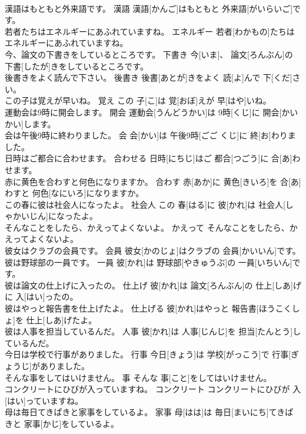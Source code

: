 \documentclass[8pt]{extreport}
\begin{document}
\begin{CJK}{UTF8}{min}
\\	漢語はもともと外来語です。	漢語	漢語[かんご]はもともと 外来語[がいらいご]です。	
\\	若者たちはエネルギーにあふれていますね。	エネルギー	若者[わかもの]たちはエネルギーにあふれていますね。	
\\	今、論文の下書きをしているところです。	下書き	今[いま]、 論文[ろんぶん]の 下書[したが]きをしているところです。	
\\	後書きをよく読んで下さい。	後書き	後書[あとが]きをよく 読[よ]んで 下[くだ]さい。	
\\	この子は覚えが早いね。	覚え	この 子[こ]は 覚[おぼ]えが 早[はや]いね。	
\\	運動会は9時に開会します。	開会	運動会[うんどうかい]は 9時[くじ]に 開会[かいかい]します。	
\\	会は午後9時に終わりました。	会	会[かい]は 午後9時[ごご くじ]に 終[お]わりました。	
\\	日時はご都合に合わせます。	合わせる	日時[にちじ]はご 都合[つごう]に 合[あ]わせます。	
\\	赤に黄色を合わすと何色になりますか。	合わす	赤[あか]に 黄色[きいろ]を 合[あ]わすと 何色[なにいろ]になりますか。	
\\	この春に彼は社会人になったよ。	社会人	この 春[はる]に 彼[かれ]は 社会人[しゃかいじん]になったよ。	
\\	そんなことをしたら、かえってよくないよ。	かえって	そんなことをしたら、かえってよくないよ。	
\\	彼女はクラブの会員です。	会員	彼女[かのじょ]はクラブの 会員[かいいん]です。	
\\	彼は野球部の一員です。	一員	彼[かれ]は 野球部[やきゅうぶ]の 一員[いちいん]です。	
\\	彼は論文の仕上げに入ったの。	仕上げ	彼[かれ]は 論文[ろんぶん]の 仕上[しあ]げに 入[はい]ったの。	
\\	彼はやっと報告書を仕上げたよ。	仕上げる	彼[かれ]はやっと 報告書[ほうこくしょ]を 仕上[しあ]げたよ。	
\\	彼は人事を担当しているんだ。	人事	彼[かれ]は 人事[じんじ]を 担当[たんとう]しているんだ。	
\\	今日は学校で行事がありました。	行事	今日[きょう]は 学校[がっこう]で 行事[ぎょうじ]がありました。	
\\	そんな事をしてはいけません。	事	そんな 事[こと]をしてはいけません。	
\\	コンクリートにひびが入っていますね。	コンクリート	コンクリートにひびが 入[はい]っていますね。	
\\	母は毎日てきぱきと家事をしているよ。	家事	母[はは]は 毎日[まいにち]てきぱきと 家事[かじ]をしているよ。	

\end{CJK}
\end{document}
